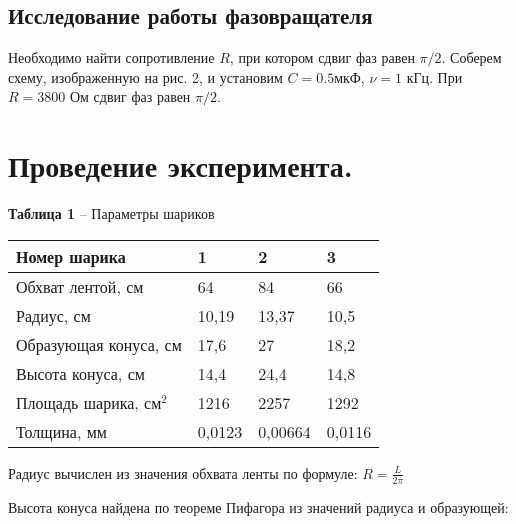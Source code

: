 \documentclass[12pt,a4paper]{article}
\begin{document}
    \subsection{Исследование работы фазовращателя}
        Необходимо найти сопротивление $R$, при котором сдвиг фаз равен $\pi/2$. Соберем схему, изображенную на рис. 2, и установим $C = 0.5$мкФ, $\nu = 1$ кГц. При $R = 3800$ Ом сдвиг фаз равен $\pi/2$.
        
\newpage
\section{Проведение эксперимента.}

       
       
        \begin{table}[!h]
        \begin{flushleft}
       		\hspace{134}\textbf{Таблица 1} -- Параметры шариков\\
        \end{flushleft}
            \begin{center}
                \begin{tabular}{ | l | l | l | l |}
                \hline
                Номер шарика            &   1       &   2       &   3       \\
                \hline
                Обхват лентой, см       &   64      &   84      &   66      \\
                Радиус, см              &   10,19   &   13,37   &   10,5    \\
                Образующая конуса, см   &   17,6    &   27      &   18,2   \\
                Высота конуса, см       &   14,4    &   24,4    &   14,8    \\
                Площадь шарика, см$^2$  &   1216    &   2257    &   1292    \\
                Толщина, мм             &   0,0123  &   0,00664 &   0,0116  \\  
                \hline
                \end{tabular}   
            \end{center}
        \end{table}
       

        Радиус вычислен из значения обхвата ленты по формуле: $R = \frac{L}{2\pi}$
        
        Высота конуса найдена по теореме Пифагора из значений радиуса и образующей:
        
\end{document}

